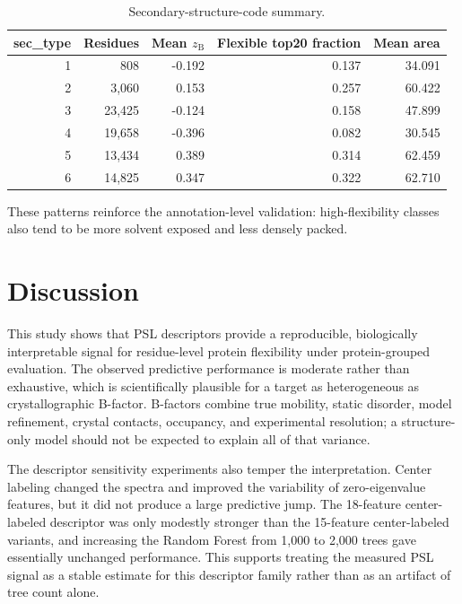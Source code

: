 \documentclass[11pt]{article}
\newcommand{\zB}{z_{\mathrm{B}}}
\begin{document}
\begin{table}[htbp]
\centering
\caption{Secondary-structure-code summary.}
\label{tab:secondary_structure}
\begin{tabular}{rrrrr}
\toprule
sec\_type & Residues & Mean $\zB$ & Flexible top20 fraction & Mean area \\
\midrule
1 & 808 & -0.192 & 0.137 & 34.091 \\
2 & 3,060 & 0.153 & 0.257 & 60.422 \\
3 & 23,425 & -0.124 & 0.158 & 47.899 \\
4 & 19,658 & -0.396 & 0.082 & 30.545 \\
5 & 13,434 & 0.389 & 0.314 & 62.459 \\
6 & 14,825 & 0.347 & 0.322 & 62.710 \\
\bottomrule
\end{tabular}
\end{table}

These patterns reinforce the annotation-level validation: high-flexibility classes also tend to be more solvent exposed and less densely packed.

\FloatBarrier

\section{Discussion}
This study shows that PSL descriptors provide a reproducible, biologically interpretable signal for residue-level protein flexibility under protein-grouped evaluation. The observed predictive performance is moderate rather than exhaustive, which is scientifically plausible for a target as heterogeneous as crystallographic B-factor. B-factors combine true mobility, static disorder, model refinement, crystal contacts, occupancy, and experimental resolution; a structure-only model should not be expected to explain all of that variance.

The descriptor sensitivity experiments also temper the interpretation. Center labeling changed the spectra and improved the variability of zero-eigenvalue features, but it did not produce a large predictive jump. The 18-feature center-labeled descriptor was only modestly stronger than the 15-feature center-labeled variants, and increasing the Random Forest from 1,000 to 2,000 trees gave essentially unchanged performance. This supports treating the measured PSL signal as a stable estimate for this descriptor family rather than as an artifact of tree count alone.
\end{document}
